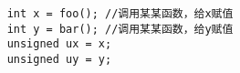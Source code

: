 \documentclass[12pt,a4paper]{article}
\begin{document}
\begin{verbatim} 
    int x = foo(); //调用某某函数，给x赋值
    int y = bar(); //调用某某函数，给y赋值
    unsigned ux = x;
    unsigned uy = y;
    \end{verbatim}
\end{document}
